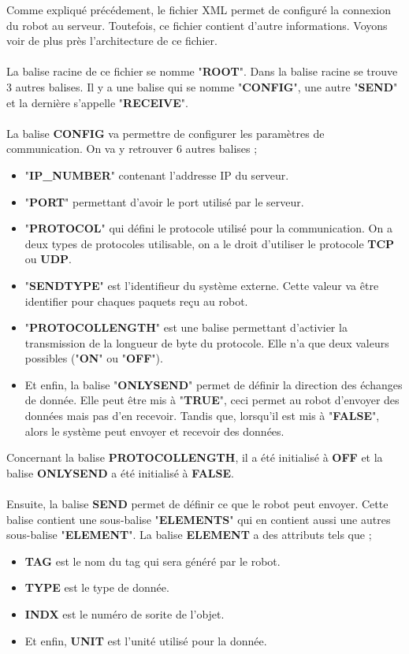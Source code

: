 Comme expliqué précédement, le fichier XML permet de configuré la connexion du robot au serveur.
Toutefois, ce fichier contient d'autre informations.
Voyons voir de plus près l'architecture de ce fichier.
\\
\\
La balise racine de ce fichier se nomme "\textbf{ROOT}".
Dans la balise racine se trouve 3 autres balises.
Il y a une balise qui se nomme "\textbf{CONFIG}", une autre "\textbf{SEND}" et la dernière s'appelle "\textbf{RECEIVE}".
\\
\\
La balise \textbf{CONFIG} va permettre de configurer les paramètres de communication.
On va y retrouver 6 autres balises ;
\begin{itemize}
    \item "\textbf{IP\_NUMBER}" contenant l'addresse IP du serveur.
    \item "\textbf{PORT}" permettant d'avoir le port utilisé par le serveur.
    \item "\textbf{PROTOCOL}" qui défini le protocole utilisé pour la communication. On a deux types de protocoles utilisable, on a le droit d'utiliser le protocole \textbf{TCP} ou \textbf{UDP}.
    \item "\textbf{SENDTYPE}" est l'identifieur du système externe. Cette valeur va être identifier pour chaques paquets reçu au robot.
    \item "\textbf{PROTOCOLLENGTH}" est une balise permettant d'activier la transmission de la longueur de byte du protocole. Elle n'a que deux valeurs possibles ("\textbf{ON}" ou "\textbf{OFF}").
    \item Et enfin, la balise "\textbf{ONLYSEND}" permet de définir la direction des échanges de donnée. Elle peut être mis à "\textbf{TRUE}", ceci permet au robot d'envoyer des données mais pas d'en recevoir. Tandis que, lorsqu'il est mis à "\textbf{FALSE}", alors le système peut envoyer et recevoir des données. 
\end{itemize}
Concernant la balise \textbf{PROTOCOLLENGTH}, il a été initialisé à \textbf{OFF} et la balise \textbf{ONLYSEND} a été initialisé à \textbf{FALSE}.
\\
\\
Ensuite, la balise \textbf{SEND} permet de définir ce que le robot peut envoyer.
Cette balise contient une sous-balise "\textbf{ELEMENTS}" qui en contient aussi une autres sous-balise "\textbf{ELEMENT}".
La balise \textbf{ELEMENT} a des attributs tels que ;
\begin{itemize}
    \item \textbf{TAG} est le nom du tag qui sera généré par le robot.
    \item \textbf{TYPE} est le type de donnée.
    \item \textbf{INDX} est le numéro de sorite de l'objet.
    \item Et enfin, \textbf{UNIT} est l'unité utilisé pour la donnée.
\end{itemize}
